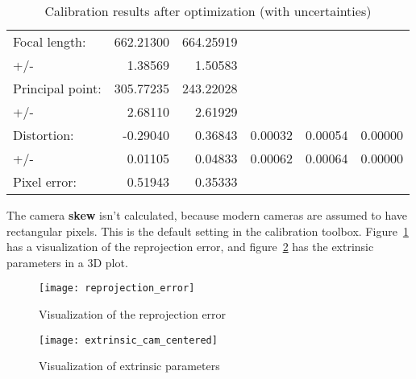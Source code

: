 \begin{table}[h]
  \centering
  \caption{Calibration results after optimization (with uncertainties)}\label{tab:optim_param}
  \begin{tabular}{l N{5}{2} N{5}{2} N{5}{2} N{5}{2} N{5}{2}}
    \toprule

    Focal length:       &   662.21300   &   664.25919   \\
    +/-                 &   1.38569     &   1.50583     \\

    \midrule

    Principal point:    &   305.77235   &   243.22028   \\
    +/-                 &   2.68110     &   2.61929     \\

    \midrule

    Distortion:  &   -0.29040 &   0.36843 &   0.00032 &   0.00054 & 0.00000 \\
    +/-          &   0.01105  &   0.04833 &   0.00062 &   0.00064 & 0.00000 \\

    \midrule

    Pixel error:        &   0.51943 &   0.35333 \\

    \bottomrule
  \end{tabular}
\end{table}

The camera \textbf{skew} isn't calculated, because modern cameras are assumed
to have rectangular pixels. This is the default setting in the calibration
toolbox. Figure~\ref{fig:reprojection} has a visualization of the reprojection
error, and figure~\ref{fig:extrinsic} has the extrinsic parameters in a 3D plot.


\begin{figure}[h]
  \centering
  \texttt{[image: reprojection\_error]}
  \caption{Visualization of the reprojection error}\label{fig:reprojection}
\end{figure}


\begin{figure}[h]
  \centering
  \texttt{[image: extrinsic\_cam\_centered]}
  \caption{Visualization of extrinsic parameters}\label{fig:extrinsic}
\end{figure}

